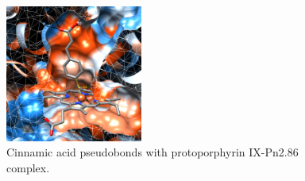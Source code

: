 \documentclass[12pt]{article}
\begin{document}
	\FloatBarrier
	
	\FloatBarrier
	\begin{figure}[H]
		\centering
		\includegraphics[width=0.4\textwidth]{../2/Dock/Dock2/chimera.png}
		\caption{Cinnamic acid pseudobonds with protoporphyrin IX-Pn2.86 complex.}
		\label{fig2_6}
	\end{figure}
	\FloatBarrier


	\newpage
	
	
	
	
	\newpage
	\tableofcontents
	\listoffigures
	\listoftables
	
\end{document}
